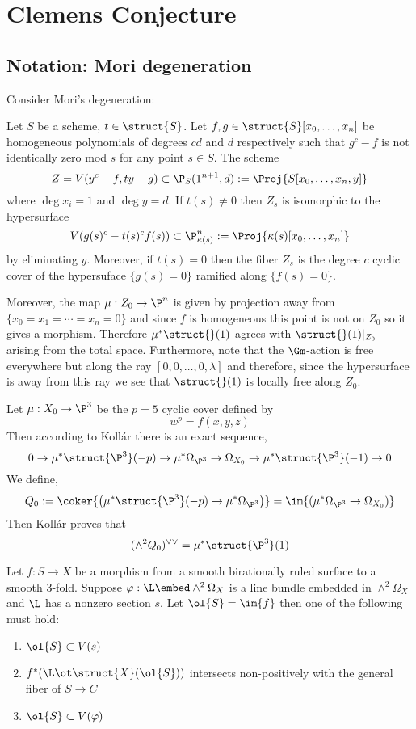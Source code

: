\documentclass[12pt]{article}
\theoremstyle{plain}
\begin{document}
\section{Clemens Conjecture}


\subsection{Notation: Mori degeneration}

Consider Mori's degeneration:

\begin{defn}
Let $S$ be a scheme, $t \in \struct{S}$. Let $f,g \in \struct{S}[x_0, \dots, x_n]$ be homogeneous polynomials of degrees $cd$ and $d$ respectively such that $g^c  - f$ is not identically zero mod $s$ for any point $s \in S$. The scheme
\[ Z = V(y^c - f, t y  - g) \subset \P_S(1^{n+1}, d) := \Proj{S[x_0, \dots, x_n, y]} \]
where $\deg{x_i} = 1$ and $\deg{y} = d$.  If $t(s) \neq 0$ then $Z_s$ is isomorphic to the hypersurface
\[ V(g(s)^c - t(s)^c f(s)) \subset \P_{\kappa(s)}^n := \Proj{\kappa(s)[x_0, \dots, x_n]} \]
by eliminating $y$. Moreover, if $t(s) = 0$ then the fiber $Z_s$ is the degree $c$ cyclic cover of the hypersuface $\{ g(s) = 0 \}$ ramified along $\{ f(s) = 0 \}$. 
\end{defn}

\begin{rmk}
Moreover, the map $\mu : Z_{0} \to \P^n$ is given by projection away from $\{ x_0 = x_1 = \cdots = x_n = 0 \}$ and since $f$ is homogeneous this point is not on $Z_0$ so it gives a morphism. Therefore $\mu^* \struct{}(1)$ agrees with $\struct{}(1)|_{Z_0}$ arising from the total space. Furthermore, note that the $\Gm$-action is free everywhere but along the ray $[0, 0, \dots, 0, \lambda]$ and therefore, since the hypersurface is away from this ray we see that $\struct{}(1)$ is locally free along $Z_0$.
\end{rmk}


Let $\mu : X_0 \to \P^3$ be the $p = 5$ cyclic cover defined by
\[ w^p = f(x,y,z) \]
Then according to Koll\'{a}r there is an exact sequence,
\[ 0 \to \mu^* \struct{\P^3}(-p) \to \mu^* \Omega_{\P^3} \to \Omega_{X_0} \to \mu^* \struct{\P^3}(-1) \to 0 \]
We define,
\[ Q_0 := \coker{\left(  \mu^* \struct{\P^3}(-p) \to \mu^* \Omega_{\P^3} \right) } = \im{\left( \mu^* \Omega_{\P^3} \to \Omega_{X_0} \right) } \]
Then Koll\'{a}r proves that
\[ (\wedge^2 Q_0)^{\vee \vee} = \mu^* \struct{\P^3}(1) \]


\begin{lemma}
Let $f : S \to X$ be a morphism from a smooth birationally ruled surface to a smooth 3-fold. Suppose $\varphi : \L \embed \wedge^2 \Omega_X$ is a line bundle embedded in $\wedge^2 \Omega_X$ and $\L$ has a nonzero section $s$. Let $\ol{S} = \im{f}$ then one of the following must hold:
\begin{enumerate}
\item $\ol{S} \subset V(s)$
\item $f^*(\L \ot \struct{X}(\ol{S}))$ intersects non-positively with the general fiber of $S \to C$
\item $\ol{S} \subset V(\varphi)$
\end{enumerate}
\end{lemma}
\end{document}
